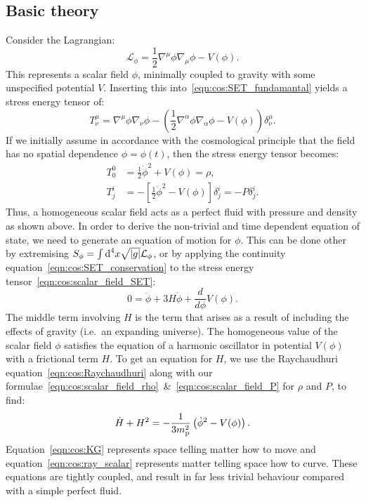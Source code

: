 \subsection{Basic theory}
Consider the Lagrangian:
\begin{equation}
  \mathcal{L}_\phi = \frac{1}{2}\nabla^\mu\phi\nabla_\mu\phi - V(\phi).
  \label{eqn:cos:scalar_field_lagrangian}
\end{equation}
This represents a scalar field $\phi$, minimally coupled to gravity with some unspecified potential $V$.  Inserting this into~\eqref{eqn:cos:SET_fundamantal} yields a stress energy tensor of:
\begin{equation}
  T^{\mu}_{\nu} = \nabla^\mu\phi\nabla_\nu\phi - \left( \frac{1}{2}\nabla^\alpha\phi \nabla_\alpha\phi - V(\phi)  \right)\delta^{\mu}_{\nu}.
  \label{eqn:cos:scalar_field_SET}
\end{equation}
If we initially assume in accordance with the cosmological principle that the field has no spatial dependence $\phi = \phi(t)$, then the stress energy tensor becomes:
\begin{align}
  T^{0}_{0} &=\frac{1}{2}\dot\phi^2 + V(\phi) = \rho,
  \label{eqn:cos:scalar_field_rho}\\
  T^{i}_{j} &=-\left[ \frac{1}{2}\dot\phi^2 - V(\phi)\right]\delta^{i}_{j} = -P\delta^{i}_{j}.
  \label{eqn:cos:scalar_field_P}
\end{align}
Thus, a homogeneous scalar field acts as a perfect fluid with pressure and density as shown above. In order to derive the non-trivial and time dependent equation of state, we need to generate an equation of motion for $\phi$. This can be done other by extremising $S_\phi = \int \d[4]{x} \sqrt{|g|} \mathcal{L}_\phi$, or by applying the continuity equation~\eqref{eqn:cos:SET_conservation} to the stress energy tensor~\eqref{eqn:cos:scalar_field_SET}: 
\begin{equation}
  0 = \ddot{\phi} + 3 H \dot{\phi} + \frac{d}{d\phi}V(\phi).
  \label{eqn:cos:KG}
\end{equation}
The middle term involving $H$ is the term that arises as a result of including the effects of gravity (i.e.\ an expanding universe). The homogeneous value of the scalar field $\phi$ satisfies the equation of a harmonic oscillator in potential $V(\phi)$ with a frictional term $H$.
To get an equation for $H$, we use the Raychaudhuri equation~\eqref{eqn:cos:Raychaudhuri} along with our formulae~\eqref{eqn:cos:scalar_field_rho}~\&~\eqref{eqn:cos:scalar_field_P} for $\rho$ and $P$, to find:
\begin{equation}
  \dot{H}+H^2 = -\frac{1}{3\m^2}\left(\dot{\phi}^2-V(\phi)\right).
  \label{eqn:cos:ray_scalar}
\end{equation}
Equation~\eqref{eqn:cos:KG} represents space telling matter how to move and equation~\eqref{eqn:cos:ray_scalar} represents matter telling space how to curve. These equations are tightly coupled, and result in far less trivial behaviour compared with a simple perfect fluid.


